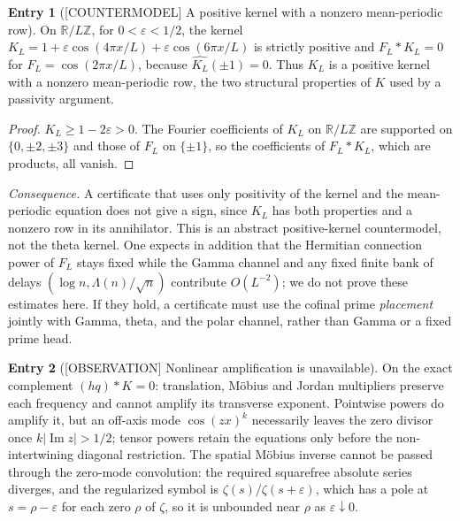 \documentclass[11pt]{amsart}
\theoremstyle{definition}
\newcounter{family}
\newtheorem{entry}{Entry}[family]
\theoremstyle{remark}
\newcommand{\R}{\mathbb R}
\newcommand{\Z}{\mathbb Z}
\newcommand{\eps}{\varepsilon}
\newcommand{\CTMD}{\textup{[COUNTERMODEL]}}
\newcommand{\OBS}{\textup{[OBSERVATION]}}
\begin{document}
\begin{entry}[\CTMD{} A positive kernel with a nonzero mean-periodic row]
\label{ent:G3}
On \(\R/L\Z\), for \(0<\eps<1/2\), the kernel
\(K_L=1+\eps\cos(4\pi x/L)+\eps\cos(6\pi x/L)\) is strictly positive and
\(F_L*K_L=0\) for \(F_L=\cos(2\pi x/L)\), because
\(\widehat{K_L}(\pm1)=0\).  Thus \(K_L\) is a positive kernel with a
nonzero mean-periodic row, the two structural properties of \(K\) used
by a passivity argument.
\end{entry}

\begin{proof}
\(K_L\ge1-2\eps>0\).  The Fourier coefficients of \(K_L\) on
\(\R/L\Z\) are supported on \(\{0,\pm2,\pm3\}\) and those of \(F_L\) on
\(\{\pm1\}\), so the coefficients of \(F_L*K_L\), which are products, all
vanish.
\end{proof}

\emph{Consequence.} A certificate that uses only positivity of the kernel
and the mean-periodic equation does not give a sign, since \(K_L\) has
both properties and a nonzero row in its annihilator.  This is an
abstract positive-kernel countermodel, not the theta kernel.  One expects
in addition that the Hermitian connection power of \(F_L\) stays fixed
while the Gamma channel and any fixed finite bank of delays
\((\log n,\Lambda(n)/\sqrt n)\) contribute \(O(L^{-2})\); we do not prove
these estimates here.  If they hold, a certificate must use the cofinal
prime \emph{placement} jointly with Gamma, theta, and the polar channel,
rather than Gamma or a fixed prime head.

\begin{entry}[\OBS{} Nonlinear amplification is unavailable]
\label{ent:G4}
On the exact complement \((hq)*K=0\): translation, M\"obius and Jordan
multipliers preserve each frequency and cannot amplify its transverse
exponent.  Pointwise powers do amplify it, but an off-axis mode
\(\cos(zx)^k\) necessarily leaves the zero divisor once
\(k|\operatorname{Im}z|>1/2\); tensor powers retain the equations only
before the non-intertwining diagonal restriction.  The spatial M\"obius
inverse cannot be passed through the zero-mode convolution: the required
squarefree absolute series diverges, and the regularized symbol is
\(\zeta(s)/\zeta(s+\eps)\), which has a pole at \(s=\rho-\eps\) for each
zero \(\rho\) of \(\zeta\), so it is unbounded near \(\rho\) as
\(\eps\downarrow0\).
\end{entry}
\end{document}
